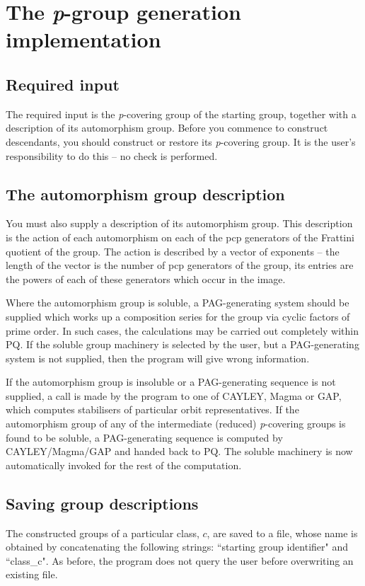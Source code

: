 \section{The {\it p}-group generation implementation}
\subsection{Required input}
The required input is the {\it p}-covering group of the starting group,
together with a description of its automorphism group.
Before you commence to construct descendants,  
you should construct or restore its {\it p}-covering group.
It is the user's responsibility to do this -- no check is performed.

\subsection{The automorphism group description}
You must also supply a description of its automorphism group.
This description is the action of each automorphism on each of the 
pcp generators of the Frattini quotient of the group.
The action is described by a vector of exponents -- the length
of the vector is the number of pcp generators of the group,
its entries are the powers of each of these generators 
which occur in the image.

Where the automorphism group is soluble, a PAG-generating system should 
be supplied which works up a composition series for the group via 
cyclic factors of prime order. In such cases, the calculations may be
carried out completely within PQ.  If the soluble 
group machinery is selected by the user, but a PAG-generating system is 
not supplied, then the program will give wrong information.

If the automorphism group is insoluble or a PAG-generating sequence 
is not supplied, a call is made by the program to one of 
CAYLEY, {\sc Magma} or {\sf GAP}, which computes stabilisers of particular 
orbit representatives.
If the automorphism group of any of the intermediate (reduced) 
{\it p}-covering groups is found to be soluble, a PAG-generating sequence 
is computed by CAYLEY/{\sc Magma}/{\sf GAP} and handed back to PQ.  The soluble machinery 
is now automatically invoked for the rest of the computation.

\subsection{Saving group descriptions}
The constructed groups of a particular class, $c$, are saved to a file,
whose name is obtained by concatenating the following strings:
``starting group identifier" and ``class\_c".  As before, the 
program does not query the user before overwriting an existing file.

